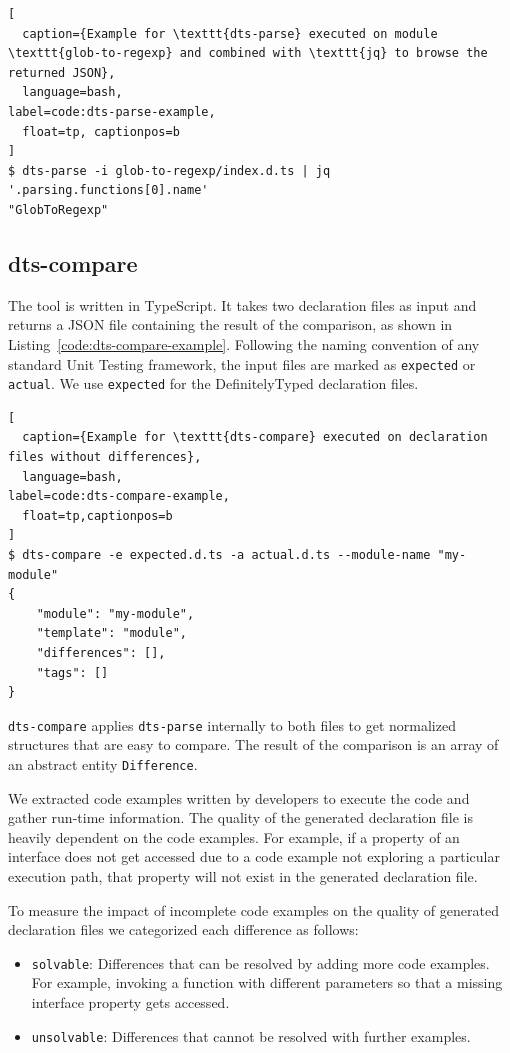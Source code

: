 \documentclass[english,cleveref,autoref,submission]{programming}
\newcommand{\coderef}[1]{Listing~\ref{#1}}
\begin{document}
\begin{lstlisting}[
  caption={Example for \texttt{dts-parse} executed on module \texttt{glob-to-regexp} and combined with \texttt{jq} to browse the returned JSON},
  language=bash,
label=code:dts-parse-example,
  float=tp, captionpos=b
]
$ dts-parse -i glob-to-regexp/index.d.ts | jq '.parsing.functions[0].name'
"GlobToRegexp"
\end{lstlisting} %

\subsection{dts-compare}
\label{sec:dts-compare}
The tool is written in TypeScript. It takes two declaration files as input and returns a
JSON file containing the result of the comparison, as shown in
\coderef{code:dts-compare-example}. Following the naming convention of any standard Unit
Testing framework, the input files are marked as \lstinline{expected} or
\lstinline{actual}. We use \lstinline{expected} for the DefinitelyTyped
declaration files. 

\begin{lstlisting}[
  caption={Example for \texttt{dts-compare} executed on declaration files without differences},
  language=bash,
label=code:dts-compare-example,
  float=tp,captionpos=b
]
$ dts-compare -e expected.d.ts -a actual.d.ts --module-name "my-module"
{
    "module": "my-module",
    "template": "module",
    "differences": [],
    "tags": []
}
\end{lstlisting}

\texttt{dts-compare} applies \texttt{dts-parse} internally to both files to get 
normalized structures that are easy to compare. The result of the comparison is an array
of an abstract entity \texttt{Difference}.

We extracted code examples written by
developers to execute the code and gather run-time information. The quality of the
generated declaration file is heavily dependent on the code examples. For example, if a
property of an interface does not get accessed due to a code example not exploring a
particular execution path, that property will not exist in the generated declaration
file. 

To measure the impact of incomplete code examples on the
quality of generated declaration files we categorized each difference as follows: 
\begin{itemize}
  \item \texttt{solvable}: Differences that can be resolved by adding more code
    examples. For example, invoking a function with different parameters so that a missing
    interface property gets accessed. 
  \item \texttt{unsolvable}: Differences that cannot be resolved with further examples.
\end{itemize}
\end{document}
